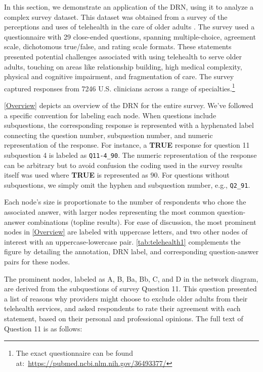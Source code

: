 In this section, we demonstrate an application of the DRN, using it to analyze a complex survey dataset. This dataset was obtained from a survey of the perceptions and uses of telehealth in the care of older adults \citep{wardlow2022perceptions}. The survey used a questionnaire with 29 close-ended questions, spanning multiple-choice, agreement scale, dichotomous true/false, and rating scale formats. These statements presented potential challenges associated with using telehealth to serve older adults, touching on areas like relationship building, high medical complexity, physical and cognitive impairment, and fragmentation of care. The survey captured responses from 7246 U.S. clinicians across a range of specialties.\footnote{The exact questionnaire can be found at:\ \url{https://pubmed.ncbi.nlm.nih.gov/36493377/}}

\autoref{Overview} depicts an overview of the DRN for the entire survey. We've followed a specific convention for labeling each node. When questions include subquestions, the corresponding response is represented with a hyphenated label connecting the question number, subquestion number, and numeric representation of the response. For instance, a \textbf{TRUE} response for question 11 subquestion 4 is labeled as \texttt{Q11-4\_90}. The numeric representation of the response can be arbitrary but to avoid confusion the coding used in the survey results itself was used where  \textbf{TRUE} is represented as $90$. For questions without subquestions, we simply omit the hyphen and subquestion number, e.g., \texttt{Q2\_91}.

Each node's size is proportionate to the number of respondents who chose the associated answer, with larger nodes representing the most common question-answer combinations (topline results). For ease of discussion, the most prominent nodes in \autoref{Overview} are labeled with uppercase letters, and two other nodes of interest with an uppercase-lowercase pair. \autoref{tab:telehealth1} complements the figure by detailing the annotation, DRN label, and corresponding question-answer pairs for these nodes.

The prominent nodes, labeled as A, B, Ba, Bb, C, and D in the network diagram, are derived from the subquestions of survey Question 11. This question presented a list of reasons why providers might choose to exclude older adults from their telehealth services, and asked respondents to rate their agreement with each statement, based on their personal and professional opinions. The full text of Question 11 is as follows:

